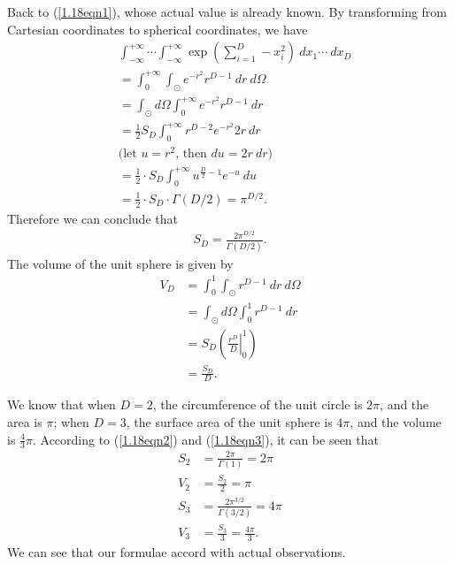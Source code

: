 \begin{answer}{}
	Back to (\ref{1.18eqn1}), whose actual value is already known. By transforming from Cartesian coordinates to spherical coordinates, we have
	\begin{align}
		&\int_{-\infty}^{+\infty} \cdots \int_{-\infty}^{+\infty} \exp(\sum_{i = 1}^{D} - x_i^2) \ dx_1 \cdots\ dx_D\\
		&= \int_{0}^{+\infty} \int_{\odot} e^{-r^2} r^{D-1}\ dr\ d\Omega\\
		&= \int_{\odot} d\Omega \int_{0}^{+\infty} e^{-r^2} r^{D-1}\ dr\\
		&= \frac{1}{2}S_D \int_{0}^{+\infty} r^{D-2} e^{-r^2} 2r\ dr\\
		&\mbox{(let $u = r^2$, then $du = 2r\ dr$)}\\
		&= \frac{1}{2}\cdot S_D \int_{0}^{+\infty} u^{\frac{D}{2} - 1} e^{-u}\ du\\
		&= \frac{1}{2}\cdot S_D \cdot \Gamma(D/2) = \pi^{D/2}.
	\end{align}
	Therefore we can conclude that
	\begin{align}\label{1.18eqn2}
		S_D = \frac{2\pi^{D/2}}{\Gamma(D/2)}.
	\end{align}
	The volume of the unit sphere is given by
	\begin{align}
		V_D &= \int_{0}^{1} \int_{\odot} r^{D-1}\ dr\ d\Omega\\
		&= \int_{\odot} d\Omega \int_{0}^{1} r^{D-1}\ dr\\
		&= S_D \left( \left. \frac{r^{D}}{D} \right\rvert^{1}_{0} \right)\\
		&= \frac{S_D}{D}. \label{1.18eqn3}
	\end{align}
	
	
	We know that when $D = 2$, the circumference of the unit circle is $2\pi$, and the area is $\pi$; when $D=3$, the surface area of the unit sphere is $4\pi$, and the volume is $\frac{4}{3}\pi$. According to (\ref{1.18eqn2}) and (\ref{1.18eqn3}), it can be seen that
	\begin{align}
		S_2 &= \frac{2\pi}{\Gamma(1)} = 2\pi\\
		V_2 &= \frac{S_2}{2} = \pi\\
		S_3 &= \frac{2\pi^{3/2}}{\Gamma(3/2)} = 4\pi\\
		V_3 &= \frac{S_3}{3} = \frac{4\pi}{3}.
	\end{align}
	We can see that our formulae accord with actual observations.
\end{answer}